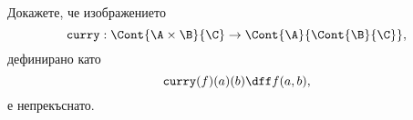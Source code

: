 \begin{problem}
  Докажете, че изображението
  \[\texttt{curry}:\Cont{\A\times \B}{\C} \to \Cont{\A}{\Cont{\B}{\C}},\]
  дефинирано като
  \[\texttt{curry}(f)(a)(b) \dff f(a,b),\]
  е непрекъснато.
\end{problem}

